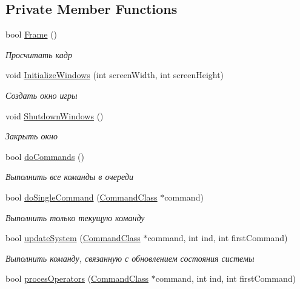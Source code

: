 \subsection*{Private Member Functions}
\begin{DoxyCompactItemize}
\item 
bool \hyperlink{class_system_class_a19c44b1a6374453ad8735c5f880181f4}{Frame} ()
\begin{DoxyCompactList}\small\item\em Просчитать кадр \end{DoxyCompactList}\item 
void \hyperlink{class_system_class_a929af051441de7bd414863aabe05fdb1}{Initialize\+Windows} (int screen\+Width, int screen\+Height)
\begin{DoxyCompactList}\small\item\em Создать окно игры \end{DoxyCompactList}\item 
void \hyperlink{class_system_class_a29bcaaac8ad0d695d4e3d09de4a93d19}{Shutdown\+Windows} ()
\begin{DoxyCompactList}\small\item\em Закрыть окно \end{DoxyCompactList}\item 
bool \hyperlink{class_system_class_a8007871209331455c3f7aa5b2991b061}{do\+Commands} ()
\begin{DoxyCompactList}\small\item\em Выполнить все команды в очереди \end{DoxyCompactList}\item 
bool \hyperlink{class_system_class_aafe0a61b5a2144016008ca529067862a}{do\+Single\+Command} (\hyperlink{class_command_class}{Command\+Class} $\ast$command)
\begin{DoxyCompactList}\small\item\em Выполнить только текущую команду \end{DoxyCompactList}\item 
bool \hyperlink{class_system_class_a19c15f7c6bc2743a04fcac998ab17677}{update\+System} (\hyperlink{class_command_class}{Command\+Class} $\ast$command, int ind, int first\+Command)
\begin{DoxyCompactList}\small\item\em Выполнить команду, связанную с обновлением состояния системы \end{DoxyCompactList}\item 
bool \hyperlink{class_system_class_adc6bf9bc3ae14f2ee2f661818a500220}{proces\+Operators} (\hyperlink{class_command_class}{Command\+Class} $\ast$command, int ind, int first\+Command)

\end{DoxyCompactItemize}

